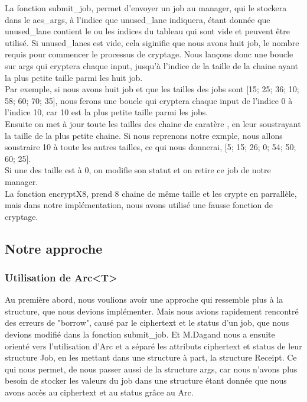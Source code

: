 \documentclass{article}
\begin{document}
La fonction submit\_job, permet d'envoyer un job au manager, qui le stockera dans le aes\_args, à l'indice que unused\_lane indiquera, étant donnée que unused\_lane contient le ou les indices du tableau qui sont vide et peuvent être utilisé. Si unused\_lanes est vide, cela siginifie que nous avons huit job, le nombre requis pour commencer le processus de cryptage.
Nous lançons donc une boucle sur args qui cryptera chaque input, jusqu'à l'indice de la taille de la chaine ayant la plus petite taille parmi les huit job. \\
Par exemple, si nous avons huit job et que les tailles des jobs sont [15; 25; 36; 10; 58; 60; 70; 35], nous ferons une boucle qui cryptera chaque input de l'indice 0 à l'indice 10, car 10 est la plus petite taille parmi les jobs. \\
Ensuite on met à jour toute les tailles des chaine de caratère , en leur soustrayant la taille de la plus petite chaine. Si nous reprenons notre exmple, nous allons soustraire 10 à toute les autres tailles, ce qui nous donnerai, [5; 15; 26; 0; 54; 50; 60; 25].\\
Si une des taille est à 0, on modifie son statut et on retire ce job de notre manager.\\
La fonction encryptX8, prend 8 chaine de même taille et les crypte en parrallèle, mais dans notre implémentation, nous avons utilisé une fausse fonction de cryptage.

\subsection{Notre approche}
\subsubsection{Utilisation de Arc<T>  }

Au première abord, nous voulions avoir une approche qui ressemble plus à la structure, que nous devions implémenter. Mais nous avions rapidement rencontré des erreurs de "borrow", causé par le ciphertext et le status d'un job, que nous devions modifié dans la fonction submit\_job. Et M.Dagand nous a ensuite orienté vers l'utilisation d'Arc et a séparé les attributs ciphertext et status de leur structure Job, en les mettant dans une structure à part, la structure Receipt. Ce qui nous permet, de nous passer aussi de la structure args, car nous n'avons plus besoin de stocker les valeurs du job dans une structure étant donnée que nous avons accès au ciphertext et au status grâce au Arc. 
\end{document}
